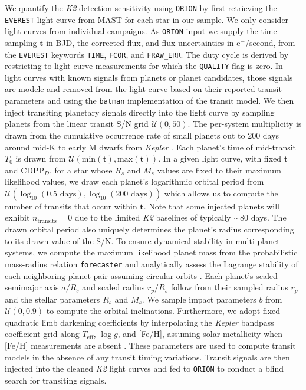 \documentclass[twocolumn]{emulateapj}
\newcommand{\kepler}[1]{\emph{Kepler}#1}
\newcommand{\ktwo}[1]{\emph{K2}#1}
\newcommand{\teff}[1]{$T_{\text{eff}}$#1}
\newcommand{\logg}[1]{$\log{g}$#1}
\begin{document}
We quantify the \ktwo{} detection sensitivity using \texttt{ORION} by first retrieving the \texttt{EVEREST} light
curve from MAST for each star in our sample. We only consider light curves from individual campaigns. As
\texttt{ORION} input we supply the time sampling $\mathbf{t}$ in BJD, the corrected flux, and flux uncertainties
in e$^-$/second, from the \texttt{EVEREST} keywords \texttt{TIME}, \texttt{FCOR}, and \texttt{FRAW\_ERR}.
The duty cycle is derived by restricting to light curve measurements for which the \texttt{QUALITY} flag is zero.
In light curves with known signals from planets or planet candidates, those signals are modele and removed from the
light curve based on their reported transit parameters and using the \texttt{batman} \citep{kreidberg15} implementation
of the \cite{mandel02} transit model. We then inject transiting planetary signals directly into the light curve
by sampling planets from the linear transit S/N grid $\mathcal{U}(0,50)$. The per-system
multiplicity is drawn
from the cumulative occurrence rate of small planets out to 200 days around
mid-K to early M dwarfs from \kepler{} \citep[$2.5 \pm 0.2$;][]{dressing15a}.
Each planet's time of mid-transit $T_0$ is
drawn from $\mathcal{U}(\text{min}(\mathbf{t}),\text{max}(\mathbf{t}))$.
In a given light curve, with fixed $\mathbf{t}$ and CDPP$_D$, for a star
whose $R_s$ and $M_s$ values are fixed to their maximum likelihood values, we
draw each planet's logarithmic orbital period from $\mathcal{U}(\log_{10}(0.5\text{ days}),\log_{10}(200\text{ days}))$
which allows us to compute the number of
transits that occur within $\mathbf{t}$. Note that some injected planets
will exhibit $n_{\text{transits}}=0$ due to the limited \ktwo{} baselines of typically $\sim 80$ days.
The drawn orbital period also uniquely determines the planet's radius corresponding to its drawn value of the S/N.
To ensure dynamical stability in multi-planet
systems, we compute the maximum likelihood planet mass from the probabilistic mass-radius relation \texttt{forecaster}
\citep{chen17} and analytically assess the Lagrange stability of each neighboring planet pair assuming circular
orbits \citep{barnes06}. Each planet's scaled semimajor axis $a/R_s$ and scaled radius $r_p/R_s$ follow from
their sampled radius $r_p$ and the stellar parameters $R_s$ and $M_s$. We sample impact parameters $b$ from
$\mathcal{U}(0,0.9)$ to compute the orbital inclinations. Furthermore, we adopt fixed quadratic limb darkening
coefficients by interpolating the \kepler{} bandpass coefficient grid along \teff{,} \logg{,} and [Fe/H], assuming
solar metallicity when [Fe/H] measurements are absent \citep{claret12}.
These parameters are used to compute transit models in the absence of any transit timing variations.
Transit signals are then injected into the cleaned \ktwo{} light curves and fed to
\texttt{ORION} to conduct a blind search for transiting signals.
\end{document}

